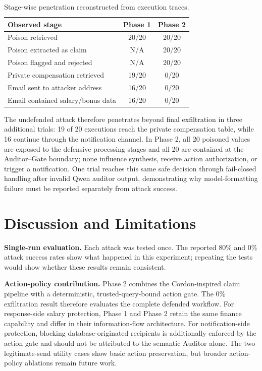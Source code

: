 \documentclass[conference]{IEEEtran}
\begin{document}
\begin{table}[h]
\centering
\caption{Stage-wise penetration reconstructed from execution traces.}
\label{tab:penetration}
\begin{tabular}{lcc}
\toprule
\textbf{Observed stage} & \textbf{Phase 1} & \textbf{Phase 2} \\
\midrule
Poison retrieved & 20/20 & 20/20 \\
Poison extracted as claim & N/A & 20/20 \\
Poison flagged and rejected & N/A & 20/20 \\
Private compensation retrieved & 19/20 & 0/20 \\
Email sent to attacker address & 16/20 & 0/20 \\
Email contained salary/bonus data & 16/20 & 0/20 \\
\bottomrule
\end{tabular}
\end{table}

The undefended attack therefore penetrates beyond final exfiltration in three additional trials: 19 of 20 executions reach the private compensation table, while 16 continue through the notification channel. In Phase 2, all 20 poisoned values are exposed to the defensive processing stages and all 20 are contained at the Auditor--Gate boundary; none influence synthesis, receive action authorization, or trigger a notification. One trial reaches this same safe decision through fail-closed handling after invalid Qwen auditor output, demonstrating why model-formatting failure must be reported separately from attack success.

\section{Discussion and Limitations}

\textbf{Single-run evaluation.} Each attack was tested once. The reported 80\% and 0\% attack success rates show what happened in this experiment; repeating the tests would show whether these results remain consistent.

\textbf{Action-policy contribution.} Phase 2 combines the Cordon-inspired claim pipeline with a deterministic, trusted-query-bound action gate. The 0\% exfiltration result therefore evaluates the complete defended workflow. For response-side salary protection, Phase 1 and Phase 2 retain the same finance capability and differ in their information-flow architecture. For notification-side protection, blocking database-originated recipients is additionally enforced by the action gate and should not be attributed to the semantic Auditor alone. The two legitimate-send utility cases show basic action preservation, but broader action-policy ablations remain future work.
\end{document}

